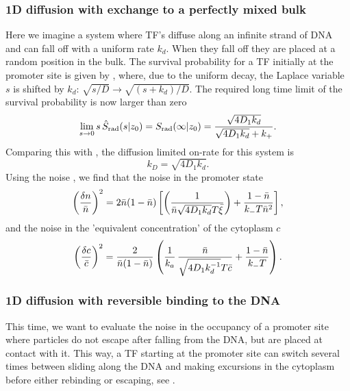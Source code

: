 \subsubsection{1D diffusion with exchange to a perfectly mixed bulk}
Here we imagine a system where TF's diffuse along an infinite strand of DNA and can fall off with a uniform rate $k_d$. When they fall off they are placed at a random position in the bulk. The survival probability for a TF initially at the promoter site is given by , where, due to the uniform decay, the Laplace variable $s$ is shifted by $k_d$: $\sqrt{s/D} \to \sqrt{(s+k_d)/D}$. The required long time limit of the survival probability is now larger than zero
\begin{equation}
 \lim_{s\to0} s \, \hat{S}_{\rm rad}(s|z_0) = S_{\rm rad}(\infty|z_0) = \frac{\sqrt{4 D_1 k_d}}{\sqrt{4 D_1 k_d} + k_+}.
\end{equation}
Comparing this with , the diffusion limited on-rate for this system is
\begin{equation}
k_D = \sqrt{4 D_1 k_d}.
\end{equation}
Using the noise , we find that the noise in the promoter state
\begin{equation}
 \elabel{NoiseProWM}
 \left( \frac{\delta n}{\bar{n}} \right)^2 = 2 \bar{n}(1-\bar{n})\left[\left( \frac{1}{\bar{n} \sqrt{4 D_1 k_d} T \bar{\xi}} \right)+\frac{1-\bar{n}}{k_- T \bar{n}^2} \right],
\end{equation}
and the noise in the 'equivalent concentration' of the cytoplasm $c$
\begin{equation}
 \elabel{NoiseCWM} 
 \left( \frac{\delta c}{\bar{c}} \right)^2 = \frac{2}{\bar{n}(1-\bar{n})} \left( \frac{1}{k_a} \, \frac{\bar{n}}{\sqrt{4 D_1 k_d^{-1}} T \bar{c}} + \frac{1-\bar{n}}{k_- T}  \right).
\end{equation}


\subsubsection{1D diffusion with reversible binding to the DNA}
This time, we want to evaluate the noise in the occupancy of a promoter site where particles do not escape after falling from the DNA, but are placed at contact with it. This way, a TF starting at the promoter site can switch several times between sliding along the DNA and making excursions in the cytoplasm before either rebinding or escaping, see . 

